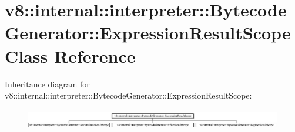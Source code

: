 \hypertarget{classv8_1_1internal_1_1interpreter_1_1_bytecode_generator_1_1_expression_result_scope}{}\section{v8\+:\+:internal\+:\+:interpreter\+:\+:Bytecode\+Generator\+:\+:Expression\+Result\+Scope Class Reference}
\label{classv8_1_1internal_1_1interpreter_1_1_bytecode_generator_1_1_expression_result_scope}
Inheritance diagram for v8\+:\+:internal\+:\+:interpreter\+:\+:Bytecode\+Generator\+:\+:Expression\+Result\+Scope\+:\begin{figure}[H]
\begin{center}
\leavevmode
\includegraphics[height=0.910569cm]{classv8_1_1internal_1_1interpreter_1_1_bytecode_generator_1_1_expression_result_scope}
\end{center}
\end{figure}
